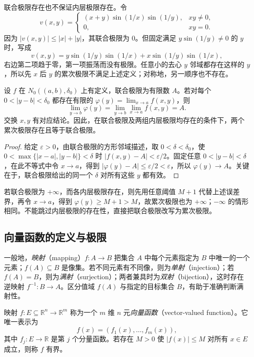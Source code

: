 联合极限存在也不保证内层极限存在。令
\[
    v(x,y)=\begin{cases}
        (x+y)\sin(1/x)\sin(1/y),&xy\neq0,\\
        0,&xy=0.
    \end{cases}
\]
因为 $|v(x,y)|\leq|x|+|y|$，其联合极限为 $0$。但固定满足 $y\sin(1/y)\neq0$ 的 $y$ 时，写成
\[
    v(x,y)=y\sin(1/y)\sin(1/x)+x\sin(1/y)\sin(1/x),
\]
右边第二项趋于零，第一项振荡而没有极限。任意小的去心 $y$ 邻域都存在这样的 $y$，所以先 $x$ 后 $y$ 的累次极限不满足上述定义；对称地，另一顺序也不存在。

\begin{theorem}[联合极限与已有的内层极限]
\label{thm:joint-limit-implies-existing-iterated-limit}
设 $f$ 在 $N_0((a,b),\delta_0)$ 上有定义，联合极限为有限数 $A$。若对每个 $0<|y-b|<\delta_0$ 都存在有限的 $\varphi(y)=\lim_{x\to a}f(x,y)$，则
\[
    \lim_{y\to b}\varphi(y)
       =\lim_{y\to b}\lim_{x\to a}f(x,y)=A.
\]
交换 $x,y$ 有对应结论。因此，在联合极限及两组内层极限均存在的条件下，两个累次极限存在且等于联合极限。
\end{theorem}

\begin{proof}
给定 $\varepsilon>0$，由联合极限的方形邻域描述，取 $0<\delta<\delta_0$，使 $0<\max\{|x-a|,|y-b|\}<\delta$ 时 $|f(x,y)-A|<\varepsilon/2$。固定任意 $0<|y-b|<\delta$，在此不等式中令 $x\to a$，得到 $|\varphi(y)-A|\leq\varepsilon/2<\varepsilon$，所以 $\varphi(y)\to A$。关键在于，联合极限给出的同一个 $\delta$ 对所有这些 $y$ 都有效。
\end{proof}

若联合极限为 $+\infty$，而各内层极限存在，则先用任意阈值 $M+1$ 代替上述误差界，再令 $x\to a$，得到 $\varphi(y)\geq M+1>M$，故累次极限也为 $+\infty$；$-\infty$ 的情形相同。不能跳过内层极限的存在性，直接把联合极限改写为累次极限。

\subsection{向量函数的定义与极限}
\label{subsec:definition-and-limits-of-vector-functions}

一般地，\emph{映射}（mapping）$f:A\to B$ 把集合 $A$ 中每个元素指定为 $B$ 中唯一的一个元素；$f(A)\subseteq B$ 是像集。若不同元素有不同像，则为\emph{单射}（injection）；若 $f(A)=B$，则为\emph{满射}（surjection）；两者兼具时为\emph{双射}（bijection），这时存在逆映射 $f^{-1}:B\to A$。区分值域 $f(A)$ 与指定的目标集合 $B$，有助于准确判断满射性。

\begin{definition}
\label{def:multivariable-vector-valued-function}
映射 $f:E\subseteq\mathbb R^n\to\mathbb R^m$ 称为一个 $m$ 维 $n$ 元\emph{向量函数}（vector-valued function）。它唯一表示为
\[
    f(x)=(f_1(x),\ldots,f_m(x)),
\]
其中 $f_j:E\to\mathbb R$ 是第 $j$ 个分量函数。若存在 $M>0$ 使 $|f(x)|\leq M$ 对所有 $x\in E$ 成立，则称 $f$ 有界。
\end{definition}

